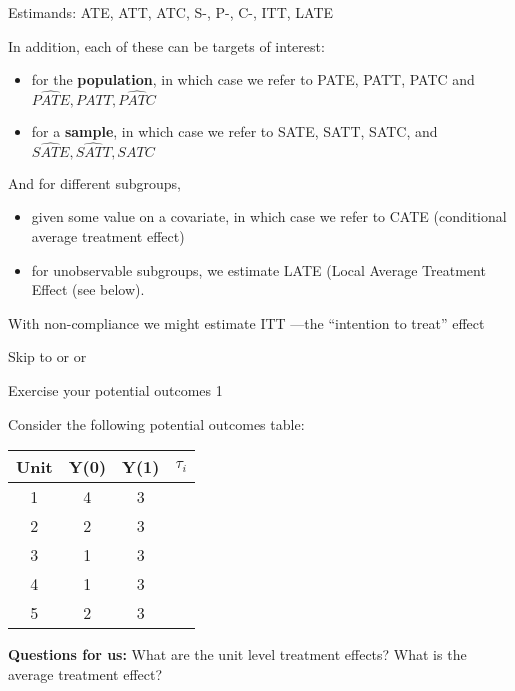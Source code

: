 \documentclass[11pt,ignorenonframetext,]{beamer}
\begin{document}
\begin{frame}{Estimands: ATE, ATT, ATC, S-, P-, C-, ITT, LATE}

\footnotesize
In addition, each of these can be targets of interest:

\begin{itemize} 
    \item for the \textbf{population}, in which case we refer to PATE, PATT, PATC and $\widehat{PATE}, \widehat{PATT},  \widehat{PATC}$
    \item for a \textbf{sample}, in which case we refer to SATE, SATT, SATC, and $\widehat{SATE}, \widehat{SATT},  \widehat{SATC}$
\end{itemize}

And for different subgroups,

\begin{itemize} 
    \item given some value on a covariate, in which case we refer to CATE (conditional average treatment effect)
    \item for unobservable subgroups, we estimate LATE (Local Average Treatment Effect (see below).
\end{itemize}

With non-compliance we might estimate ITT ---the ``intention to treat''
effect

\bigskip
Skip to \hyperlink{Fixer}{} or
\hyperlink{nools}{} or
\hyperlink{ideas}{}

\end{frame}

\begin{frame}{Exercise your potential outcomes 1}

Consider the following potential outcomes table:

\begin{table} \centering
\begin{tabular}{c|c|c|c}
Unit    &Y(0)   &Y(1)   &$\tau_i$ \\ \hline
1   & 4 & 3 \\
2   & 2 & 3 \\
3   & 1 & 3 \\
4   & 1 & 3 \\
5   & 2 & 3 
\end{tabular} 
\end{table}

\color{red}\textbf{Questions for us:} What are the unit level treatment
effects? What is the average treatment effect?

\end{frame}
\end{document}
